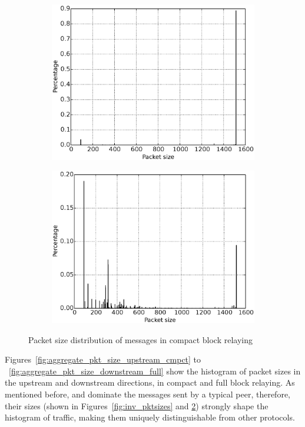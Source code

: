 \begin{figure}[h]
\begin{subfigure}{0.24\linewidth}
\includegraphics[width=\linewidth]{image/blocktxn_pktsizes.eps}
\caption{}
\label{fig:blocktxn_pktsizes}
\end{subfigure}
\begin{subfigure}{0.24\linewidth}
\includegraphics[width=\linewidth]{image/tx_pktsizes.eps}
\caption{}
\label{fig:tx_pktsizes}
\end{subfigure}
\caption{Packet size distribution of \bc messages in compact block relaying}\label{fig:sizedist}
\end{figure}

Figures~\ref{fig:aggregate_pkt_size_upstream_cmpct} to ~\ref{fig:aggregate_pkt_size_downstream_full} show the histogram of packet sizes in the upstream and downstream directions, in compact and full block relaying. 
As mentioned before,  and  dominate the messages sent by a typical \bc peer, therefore, their sizes 
(shown in Figures~\ref{fig:inv_pktsizes} and \ref{fig:tx_pktsizes}) strongly shape the histogram of \bc traffic, making them uniquely distinguishable from other protocols. 

